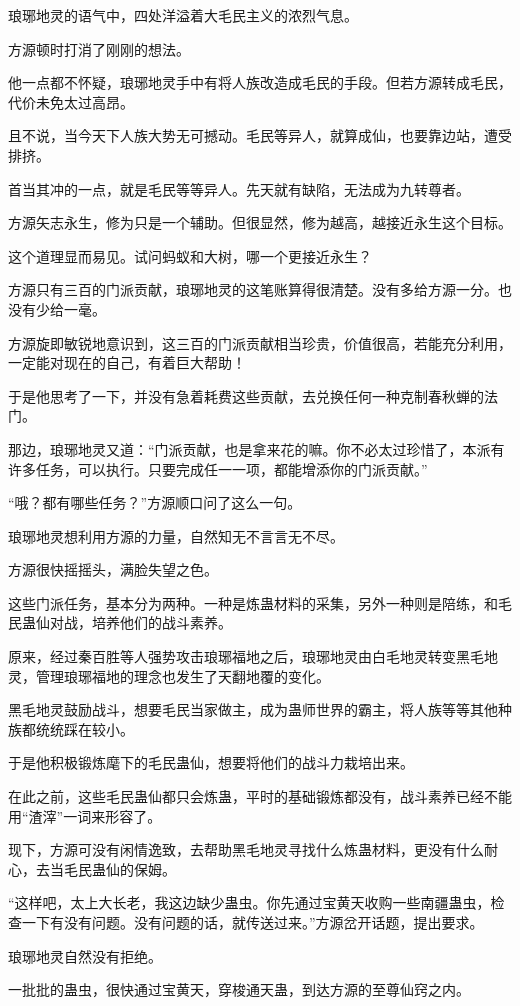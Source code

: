 \begin{this_body}
琅琊地灵的语气中，四处洋溢着大毛民主义的浓烈气息。

方源顿时打消了刚刚的想法。

他一点都不怀疑，琅琊地灵手中有将人族改造成毛民的手段。但若方源转成毛民，代价未免太过高昂。

且不说，当今天下人族大势无可撼动。毛民等异人，就算成仙，也要靠边站，遭受排挤。

首当其冲的一点，就是毛民等等异人。先天就有缺陷，无法成为九转尊者。

方源矢志永生，修为只是一个辅助。但很显然，修为越高，越接近永生这个目标。

这个道理显而易见。试问蚂蚁和大树，哪一个更接近永生？

方源只有三百的门派贡献，琅琊地灵的这笔账算得很清楚。没有多给方源一分。也没有少给一毫。

方源旋即敏锐地意识到，这三百的门派贡献相当珍贵，价值很高，若能充分利用，一定能对现在的自己，有着巨大帮助！

于是他思考了一下，并没有急着耗费这些贡献，去兑换任何一种克制春秋蝉的法门。

那边，琅琊地灵又道：“门派贡献，也是拿来花的嘛。你不必太过珍惜了，本派有许多任务，可以执行。只要完成任一一项，都能增添你的门派贡献。”

“哦？都有哪些任务？”方源顺口问了这么一句。

琅琊地灵想利用方源的力量，自然知无不言言无不尽。

方源很快摇摇头，满脸失望之色。

这些门派任务，基本分为两种。一种是炼蛊材料的采集，另外一种则是陪练，和毛民蛊仙对战，培养他们的战斗素养。

原来，经过秦百胜等人强势攻击琅琊福地之后，琅琊地灵由白毛地灵转变黑毛地灵，管理琅琊福地的理念也发生了天翻地覆的变化。

黑毛地灵鼓励战斗，想要毛民当家做主，成为蛊师世界的霸主，将人族等等其他种族都统统踩在较小。

于是他积极锻炼麾下的毛民蛊仙，想要将他们的战斗力栽培出来。

在此之前，这些毛民蛊仙都只会炼蛊，平时的基础锻炼都没有，战斗素养已经不能用“渣滓”一词来形容了。

现下，方源可没有闲情逸致，去帮助黑毛地灵寻找什么炼蛊材料，更没有什么耐心，去当毛民蛊仙的保姆。

“这样吧，太上大长老，我这边缺少蛊虫。你先通过宝黄天收购一些南疆蛊虫，检查一下有没有问题。没有问题的话，就传送过来。”方源岔开话题，提出要求。

琅琊地灵自然没有拒绝。

一批批的蛊虫，很快通过宝黄天，穿梭通天蛊，到达方源的至尊仙窍之内。


\end{this_body}
